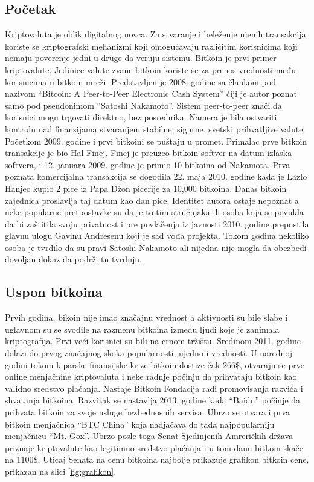 \documentclass[a4paper]{article}
\begin{document}
\subsection{Početak}
Kriptovaluta je oblik digitalnog novca. Za stvaranje i beleženje njenih transakcija koriste se kriptografski mehanizmi koji omogućavaju različitim korisnicima koji nemaju poverenje jedni u druge da veruju sistemu. Bitkoin je prvi primer kriptovalute. Jedinice valute zvane bitkoin koriste  se za prenos vrednosti među korisnicima u bitkoin mreži. Predstavljen je 2008. godine sa člankom pod nazivom ``Bitcoin: A Peer-to-Peer Electronic Cash System'' čiji je autor poznat samo pod pseudonimom  ``Satoshi Nakamoto''. Sistem peer-to-peer znači da korisnici mogu trgovati direktno, bez posrednika. Namera je bila ostvariti kontrolu nad finansijama stvaranjem stabilne, sigurne, svetski prihvatljive valute. 
Početkom 2009. godine i prvi bitkoini se puštaju u promet. Primalac prve bitkoin transakcije je bio Hal Finej. Finej je preuzeo bitkoin softver na datum izlaska softvera, i 12. januara 2009. godine je primio 10 bitkoina od Nakamota. Prva poznata komercijalna transakcija se dogodila 22. maja 2010. godine kada je Lazlo Hanjec kupio 2 pice iz Papa Džon picerije za 10,000 bitkoina. Danas bitkoin zajednica proslavlja taj datum kao dan pice. 
Identitet autora ostaje nepoznat a neke popularne pretpostavke su da je to tim stručnjaka  ili osoba koja se povukla da bi zaštitila svoju privatnost i pre povlačenja iz javnosti 2010. godine prepustila glavnu ulogu Gavinu Andresenu koji je sad vođa projekta. Tokom godina nekoliko osoba je tvrdilo da su pravi Satoshi Nakamoto ali nijedna nije mogla da obezbedi dovoljan dokaz da podrži tu tvrdnju.

\subsection{Uspon bitkoina}
Prvih godina, bikoin nije imao značajnu vrednost a aktivnosti su bile slabe i uglavnom su se svodile na razmenu bitkoina između ljudi koje je zanimala kriptografija. Prvi veći korisnici su bili na crnom tržištu. Sredinom 2011. godine dolazi do prvog značajnog skoka popularnosti, ujedno i vrednosti. U narednoj godini tokom kiparske finansijske krize bitkoin dostize čak 266\$, otvaraju se prve online menjačnine kriptovaluta i neke radnje počinju da prihvataju bitkoin kao validno sredstvo plaćanja. Nastaje Bitkoin Fondacija radi promovisanja razvića i shvatanja bitkoina. Razvitak se nastavlja 2013. godine kada ``Baidu'' počinje da prihvata bitkoin za svoje usluge bezbednosnih servisa. Ubrzo se otvara i prva bitkoin menjačnica ``BTC China'' koja nadjačava do tada najpopularniju menjačnicu ``Mt. Gox''. Ubrzo posle toga Senat Sjedinjenih Amreričkih država priznaje kriptovalute kao legitimno sredstvo plaćanja i u tom danu bitkoin skače na 1100\$. Uticaj Senata na cenu bitkoina najbolje prikazuje grafikon bitkoin cene, prikazan na slici \ref{fig:grafikon}.
\end{document}
